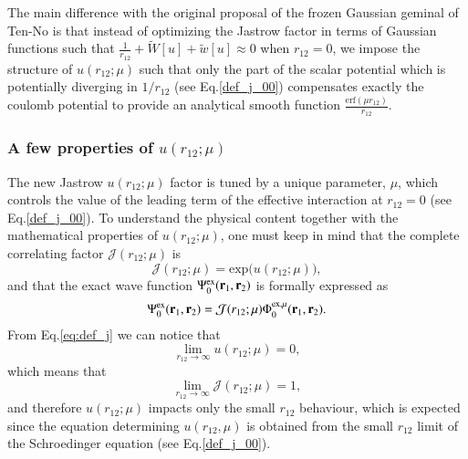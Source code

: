 \documentclass[aip,jcp,reprint,noshowkeys,superscriptaddress]{revtex4-1}
\newcommand{\br}[0]{{\bf {r}}}
\newcommand{\psiex}[0]{\Psi^{\text{ex}}_0}
\newcommand{\phimu}[0]{\Phi^{\text{ex},\mu}_0}
\begin{document}
The main difference with the original proposal of the frozen Gaussian geminal of Ten-No\cite{TenNo-CPL-00-a} is that instead of optimizing the Jastrow factor in terms of Gaussian functions such that $\frac{1}{r_{12}}  + \tilde{W}[u] + \tilde{w}[u] \approx 0$ when $r_{12}=0$, 
we impose the structure of $u(r_{12};\mu)$ such that only the part of the scalar potential which is potentially diverging in $1/r_{12}$ (see Eq.\eqref{def_j_00}) compensates exactly the coulomb potential to provide an analytical smooth function $\frac{\text{erf}(\mu r_{12})}{r_{12}} $. 

\subsubsection{A few properties of $u(r_{12};\mu)$}
The new Jastrow $u(r_{12};\mu)$ factor is tuned by a unique parameter, $\mu$, which controls the value of the leading term of the effective interaction at $r_{12}=0$ (see Eq.\eqref{def_j_00}). 
To understand the physical content together with the mathematical properties of $u(r_{12};\mu)$, 
one must keep in mind that the complete correlating factor $\mathcal{J}(r_{12};\mu)$ is 
\begin{equation}
 \mathcal{J}(r_{12};\mu) = \text{exp}\big(u(r_{12};\mu)\big),
\end{equation}
and that the exact wave function $\psiex(\br{}_1,\br{}_2)$ is formally expressed as 
\begin{equation}
 \psiex(\br{}_1,\br{}_2) = \mathcal{J}(r_{12};\mu) \phimu(\br{}_{1},\br{}_{2}).  
\end{equation}
From Eq.\eqref{eq:def_j} we can notice that 
\begin{equation}
 \lim_{r_{12} \rightarrow \infty}u(r_{12};\mu) = 0,
\end{equation}
which means that 
\begin{equation}
 \lim_{r_{12} \rightarrow \infty}\mathcal{J}(r_{12};\mu) = 1,
\end{equation}
and therefore $u(r_{12};\mu)$ impacts only the small $r_{12}$ behaviour,  
which is expected since the equation determining $u(r_{12},\mu)$ is obtained from the small $r_{12}$ limit of the Schroedinger equation (see Eq.\eqref{def_j_00}). 
\end{document}
